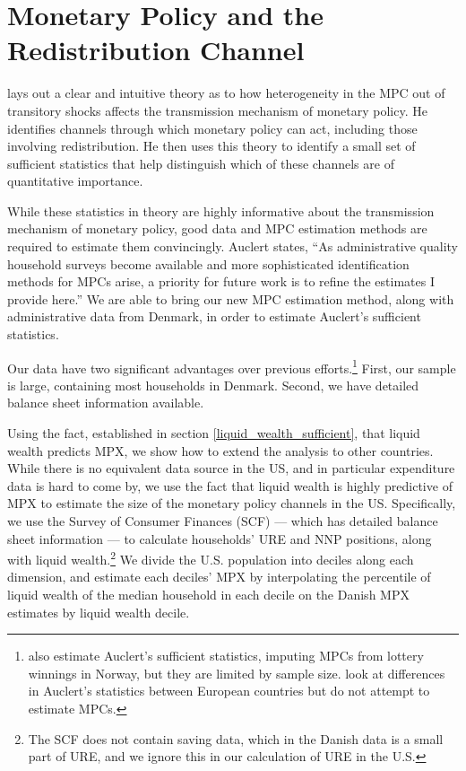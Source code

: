 \documentclass[titlepage]{\econtex}\newcommand{\texname}{ConsumptionHeterogeneity}
\begin{document}
	\section{Monetary Policy and the Redistribution Channel} \label{monetary_policy}
	\cite{auclert_monetary_2017} lays out a clear and intuitive theory as to how heterogeneity in the MPC out of transitory shocks affects the transmission mechanism of monetary policy. He identifies channels through which monetary policy can act, including those involving redistribution. He then uses this theory to identify a small set of sufficient statistics that help distinguish which of these channels are of quantitative importance.
	
	While these statistics in theory are highly informative about the transmission mechanism of monetary policy, good data and MPC estimation methods are required to estimate them convincingly. Auclert states, ``As administrative quality household surveys become available and more sophisticated identification methods for MPCs arise, a priority for future work is to refine the estimates I provide here.'' We are able to bring our new MPC estimation method, along with administrative data from Denmark, in order to estimate Auclert's sufficient statistics.
	
	Our data have two significant advantages over previous efforts.\footnote{\cite{fagereng_mpc_2016} also estimate Auclert's sufficient statistics, imputing MPCs from lottery winnings in Norway, but they are limited by sample size. \cite{ampudia_monetary_2018} look at differences in Auclert's statistics between European countries but do not attempt to estimate MPCs.} First, our sample is large, containing most households in Denmark. Second, we have detailed balance sheet information available.
	
	Using the fact, established in section \ref{liquid_wealth_sufficient}, that liquid wealth predicts MPX, we show how to extend the analysis to other countries. While there is no equivalent data source in the US, and in particular expenditure data is hard to come by, we use the fact that liquid wealth is highly predictive of MPX to estimate the size of the monetary policy channels in the US. Specifically, we use the Survey of Consumer Finances (SCF) --- which has detailed balance sheet information --- to calculate households' URE and NNP positions, along with liquid wealth.\footnote{The SCF does not contain saving data, which in the Danish data is a small part of URE, and we ignore this in our calculation of URE in the U.S.} We divide the U.S. population into deciles along each dimension, and estimate each deciles' MPX by interpolating the percentile of liquid wealth of the median household in each decile on the Danish MPX estimates by liquid wealth decile.
	
\end{document}
